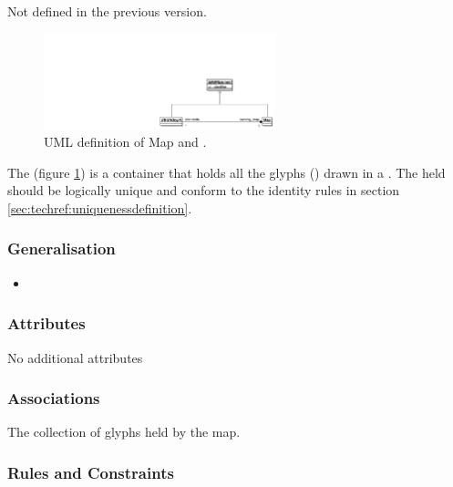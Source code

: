 Not defined in the previous version.

\label{defn:Map}\label{sec:techref:map}


\begin{figure}[htb]
  \centering
  \includegraphics[width=0.6\textwidth]{images/mapuml}
  \caption{UML definition of Map and .}
  \label{fig:techref:mapuml}
\end{figure}

The  (figure \ref{fig:techref:mapuml}) is a container that
holds all the glyphs () drawn in a \PDm. The
 held should be logically unique and conform to the
identity rules in section \ref{sec:techref:uniquenessdefinition}.


\subsubsection{Generalisation}

\begin{itemize}
\item {}
\end{itemize}

\subsubsection{Attributes}

No additional attributes

\subsubsection{Associations}

\begin{attributes}
 The collection of glyphs held by the map.
\end{attributes}

\subsubsection{Rules and Constraints}

